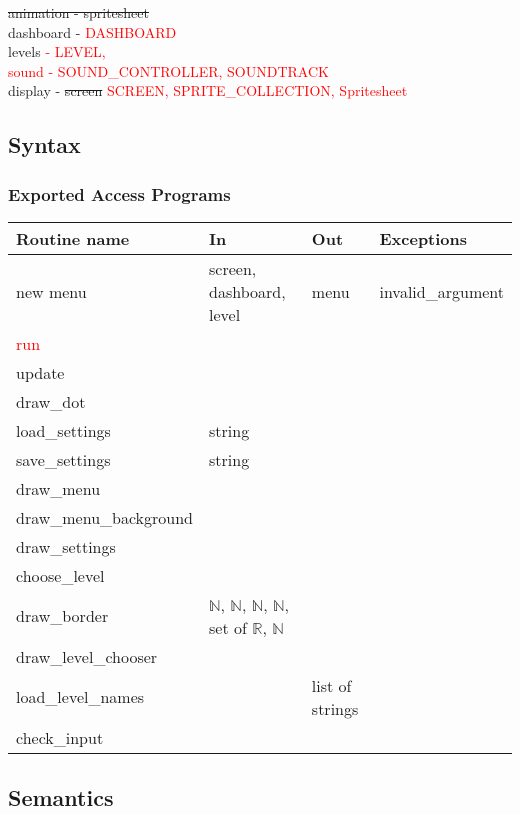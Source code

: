 \documentclass[12pt]{article}
\begin{document}
\sout{animation - spritesheet} \\
dashboard - \textcolor{red}{DASHBOARD} \\
levels \textcolor{red}{- LEVEL, } \\
\textcolor{red}{sound - SOUND\_CONTROLLER, SOUNDTRACK} \\
display - \sout{screen} \textcolor{red}{SCREEN, SPRITE\_COLLECTION, Spritesheet}

\subsection* {Syntax}

\subsubsection* {Exported Access Programs}

\begin{tabular}{| l | l | l | l |}
\hline
\textbf{Routine name} & \textbf{In} & \textbf{Out} & \textbf{Exceptions}\\
\hline
new menu & screen, dashboard, level & menu & invalid\_argument\\
\hline
\textcolor{red}{run} & & & \\
\hline
update & & & \\
\hline
draw\_dot & & & \\
\hline
load\_settings & string & & \\
\hline
save\_settings & string & & \\
\hline
draw\_menu & & & \\
\hline
draw\_menu\_background & & & \\
\hline
draw\_settings & & & \\
\hline
choose\_level & & & \\
\hline
draw\_border & $\mathbb{N}$, $\mathbb{N}$, $\mathbb{N}$, $\mathbb{N}$, set of $\mathbb{R}$, $\mathbb{N}$ & & \\
\hline
draw\_level\_chooser & & & \\
\hline
load\_level\_names & & list of strings & \\
\hline
check\_input & & & \\
\hline
\end{tabular}

\subsection* {Semantics}
\end{document}
